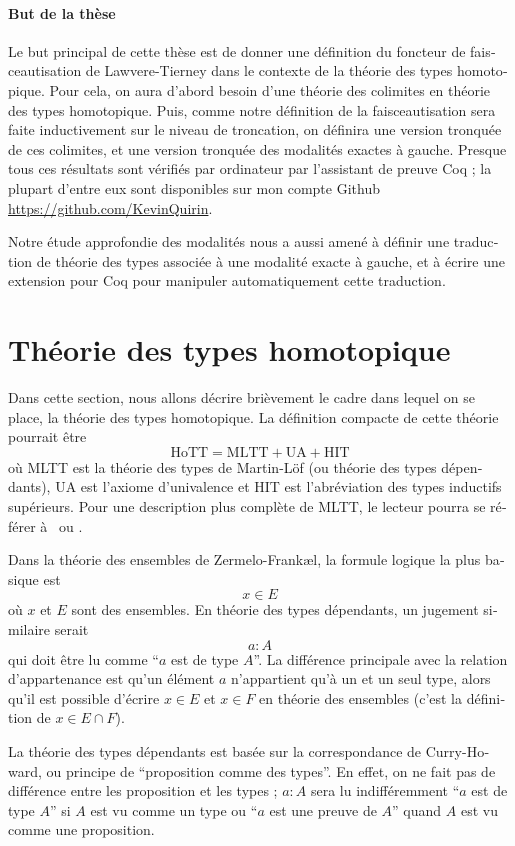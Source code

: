 \begin{otherlanguage}{french}
\paragraph*{But de la thèse}
Le but principal de cette thèse est de donner une définition du
foncteur de faisceautisation de Lawvere-Tierney dans le contexte de la
théorie des types homotopique. Pour cela, on aura d'abord besoin d'une
théorie des colimites en théorie des types homotopique. Puis, comme
notre définition de la faisceautisation sera faite inductivement sur
le niveau de troncation, on définira une version tronquée de ces
colimites, et une version tronquée des modalités exactes à gauche. 
Presque tous ces résultats sont vérifiés par ordinateur par l'assistant de
preuve Coq ; la plupart d'entre eux sont disponibles sur mon compte
Github \url{https://github.com/KevinQuirin}.

Notre étude approfondie des modalités nous a aussi amené à définir une
traduction de théorie des types associée à une modalité exacte à
gauche, et à écrire une extension pour Coq pour manipuler
automatiquement cette traduction.

\section{Théorie des types homotopique}
Dans cette section, nous allons décrire brièvement le cadre dans
lequel on se place, la théorie des types homotopique. La définition
compacte de cette théorie pourrait être
\[
  \mathrm{HoTT} = \mathrm{MLTT}+\mathrm{UA}+\mathrm{HIT}
\]
où MLTT est la théorie des types de Martin-Löf (ou théorie des types
dépendants), UA est l'axiome
d'univalence et HIT est l'abréviation des types inductifs supérieurs.
Pour une description plus complète de MLTT, le lecteur pourra se référer
à~\cite{hofmann1997syntax} ou \cite{hottbook}.

Dans la théorie des ensembles de Zermelo-Frank\ae l, la formule
logique la plus basique est
\[ x\in E\]
où $x$ et $E$ sont des ensembles. En théorie des types dépendants, un
jugement similaire serait 
\[ a : A\]
qui doit être lu comme ``$a$ est de type $A$''. La différence
principale avec la relation d'appartenance est qu'un élément $a$
n'appartient qu'à un et un seul type, alors qu'il est possible
d'écrire $x\in E$ et $x\in F$ en théorie des ensembles (c'est la
définition de $x\in E\cap F$).

La théorie des types dépendants est basée sur la correspondance de
Curry-Howard, ou principe de ``proposition comme des types''. En
effet, on ne fait pas de différence entre les proposition et les
types ; $a:A$ sera lu indifféremment ``$a$ est de type $A$'' si $A$
est vu comme un type ou ``$a$ est une preuve de $A$'' quand $A$ est vu
comme une proposition. 


\end{otherlanguage}
